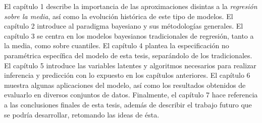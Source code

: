 \documentclass[letterpaper,onside,11pt,review]{report}
\begin{document}
El cap\'itulo 1 describe la importancia de las aproximaciones disintas a la \textit{regresi\'on sobre la media}, así como la evoluci\'on hist\'orica de este tipo de modelos. El cap\'itulo 2 introduce al paradigma bayesiano y sus m\'etodolog\'ias generales. El cap\'itulo 3 se centra en los modelos bayesianos tradicionales de regresi\'on, tanto a la media, como sobre cuantiles. El cap\'itulo 4 plantea la especificaci\'on no param\'etrica espec\'ifica del modelo de esta tesis, separ\'andolo de los tradicionales. El cap\'itulo 5 introduce las variables latentes y algoritmos necesarios para realizar inferencia y predicci\'on con lo expuesto en los cap\'itulos anteriores. El cap\'itulo 6 muestra algunas aplicaciones del modelo, as\'i como los resultados obtenidos de evaluarlo en diversos conjuntos de datos. Finalmente, el cap\'itulo 7 hace referencia a las conclusiones finales de esta tesis, adem\'as de describir el trabajo futuro que se podr\'ia desarrollar, retomando las ideas de \'esta.


\tableofcontents








%

%

%

\nocite{*} %


%
\end{document}
